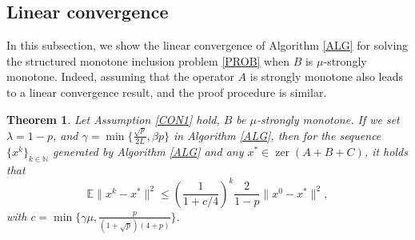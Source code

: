 \documentclass[a4paper,12pt]{article}
\newtheorem{theorem}{Theorem}[section]
\theoremstyle{definition}
\newtheorem{rem}[dfn]{Remark}
\DeclareMathOperator*{\zer}{zer}
\begin{document}
\subsection{Linear convergence}
In this subsection, we show the linear convergence of Algorithm \ref{ALG} for solving the structured monotone inclusion problem \eqref{PROB} when $B$ is $\mu$-strongly monotone. Indeed, assuming that the operator $A$ is strongly monotone also leads to a linear convergence result, and the proof procedure is similar.
\begin{theorem}
\label{theorem2}
{
\noindent
Let Assumption \ref{CON1} hold, $B$ be $\mu$-strongly monotone. If we set $\lambda=1-p$, and $\gamma=\min\{\frac{\sqrt{p}}{2L},\beta p\}$ in Algorithm \ref{ALG}, then for the sequence $\{x^k\}_{k \in \mathbb{N}}$ generated by Algorithm \ref{ALG} and any $x^* \in \zer(A+B+C)$, it holds that
\begin{equation}
\label{xx}
\mathbb{E}\|x^k-x^*\|^2 \leq (\frac{1}{1+c/4})^k \frac{2}{1-p} \|x^0-x^*\|^2,
\end{equation}
with $c=\min \{ \gamma \mu, \frac{p}{(1+\sqrt p)(4+p)}\}$.
}
\end{theorem}
\end{document}
